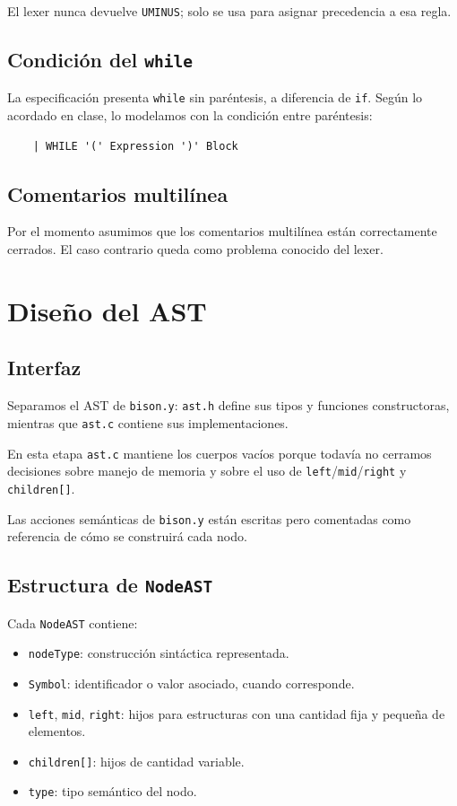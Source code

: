 \documentclass[11pt,a4paper]{article}
\begin{document}
El lexer nunca devuelve \texttt{UMINUS}; solo se usa para asignar precedencia
a esa regla.

\subsection{Condición del \texttt{while}}

La especificación presenta \texttt{while} sin paréntesis, a diferencia de
\texttt{if}. Según lo acordado en clase, lo modelamos con la condición entre
paréntesis:

\begin{verbatim}
    | WHILE '(' Expression ')' Block
\end{verbatim}

\subsection{Comentarios multilínea}

Por el momento asumimos que los comentarios multilínea están correctamente
cerrados. El caso contrario queda como problema conocido del lexer.

\section{Diseño del AST}
\label{sec:ast}

\subsection{Interfaz}

Separamos el AST de \texttt{bison.y}: \texttt{ast.h} define sus tipos y
funciones constructoras, mientras que \texttt{ast.c} contiene sus
implementaciones.

En esta etapa \texttt{ast.c} mantiene los cuerpos vacíos porque todavía no
cerramos decisiones sobre manejo de memoria y sobre el uso de
\texttt{left}/\texttt{mid}/\texttt{right} y \texttt{children[]}.

Las acciones semánticas de \texttt{bison.y} están escritas pero comentadas
como referencia de cómo se construirá cada nodo.

\subsection{Estructura de \texttt{NodeAST}}

Cada \texttt{NodeAST} contiene:

\begin{itemize}
  \item \texttt{nodeType}: construcción sintáctica representada.
  \item \texttt{Symbol}: identificador o valor asociado, cuando corresponde.
  \item \texttt{left}, \texttt{mid}, \texttt{right}: hijos para estructuras
  con una cantidad fija y pequeña de elementos.
  \item \texttt{children[]}: hijos de cantidad variable.
  \item \texttt{type}: tipo semántico del nodo.
\end{itemize}
\end{document}
